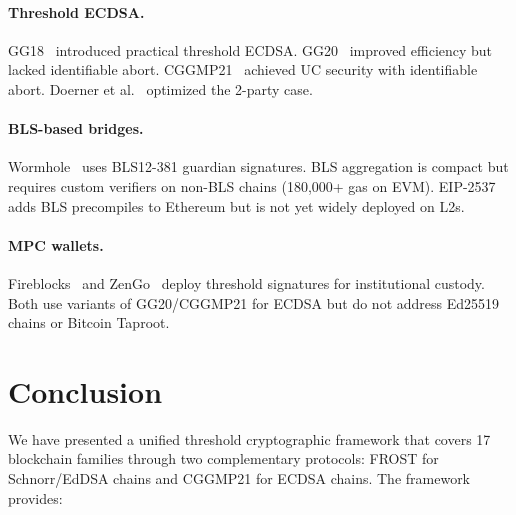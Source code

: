 \documentclass[11pt,twocolumn]{article}
\begin{document}
\paragraph{Threshold ECDSA.}
GG18~\cite{gennaro2018} introduced practical threshold ECDSA.
GG20~\cite{gennaro2020} improved efficiency but lacked identifiable abort.
CGGMP21~\cite{canetti2021cggmp} achieved UC security with identifiable abort.
Doerner et al.~\cite{doerner2018} optimized the 2-party case.

\paragraph{BLS-based bridges.}
Wormhole~\cite{wormhole2023} uses BLS12-381 guardian signatures. BLS aggregation is
compact but requires custom verifiers on non-BLS chains (180,000+ gas on EVM). EIP-2537
adds BLS precompiles to Ethereum but is not yet widely deployed on L2s.

\paragraph{MPC wallets.}
Fireblocks~\cite{fireblocks2023} and ZenGo~\cite{zengo2019} deploy threshold
signatures for institutional custody. Both use variants of GG20/CGGMP21 for ECDSA but
do not address Ed25519 chains or Bitcoin Taproot.

\section{Conclusion}
\label{sec:conclusion}

We have presented a unified threshold cryptographic framework that covers 17 blockchain
families through two complementary protocols: FROST for Schnorr/EdDSA chains and
CGGMP21 for ECDSA chains. The framework provides:
\end{document}
